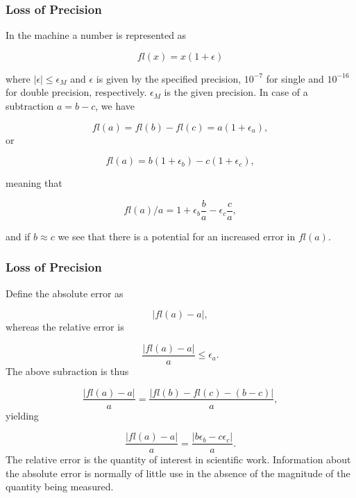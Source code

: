 \documentclass{beamer}
\newenvironment{block_mdfboxadmon}[1][]{\begin{block}{#1}}{\end{block}}
\begin{document}
\begin{frame}
\frametitle{Loss of Precision}

\begin{block_mdfboxadmon}
In the machine a number is represented as

\begin{equation}
  fl(x)= x(1+\epsilon)
\end{equation}

where $|\epsilon| \leq \epsilon_M$ and $\epsilon$ is given by the
specified precision, $10^{-7}$ for single and $10^{-16}$ for double
precision, respectively.
$\epsilon_M$ is the given precision.
In case of a subtraction $a=b-c$, we have

\begin{equation}
   fl(a)=fl(b)-fl(c) = a(1+\epsilon_a),
\end{equation}
or

\begin{equation}
   fl(a)=b(1+\epsilon_b)-c(1+\epsilon_c),
\end{equation}

meaning that

\begin{equation}
   fl(a)/a=1+\epsilon_b\frac{b}{a}- \epsilon_c\frac{c}{a},
\end{equation}

and if $b\approx c$ we see that there is a potential for an increased
error in $fl(a)$.
\end{block_mdfboxadmon}
\end{frame}

\begin{frame}
\frametitle{Loss of Precision}

\begin{block_mdfboxadmon}
Define
the absolute error as

\begin{equation}
   |fl(a)-a|,
\end{equation}
whereas the relative error is

\begin{equation}
   \frac{ |fl(a)-a|}{a} \le \epsilon_a.
\end{equation}
The above subraction is thus

\begin{equation}
   \frac{ |fl(a)-a|}{a}=\frac{ |fl(b)-fl(c)-(b-c)|}{a},
\end{equation}
yielding

\begin{equation}
   \frac{ |fl(a)-a|}{a}=\frac{ |b\epsilon_b- c\epsilon_c|}{a}.
\end{equation}
The relative error
is the quantity of interest in scientific work. Information about the
absolute error is normally of little use in the absence of the magnitude
of the quantity being measured.
\end{block_mdfboxadmon}
\end{frame}
\end{document}
